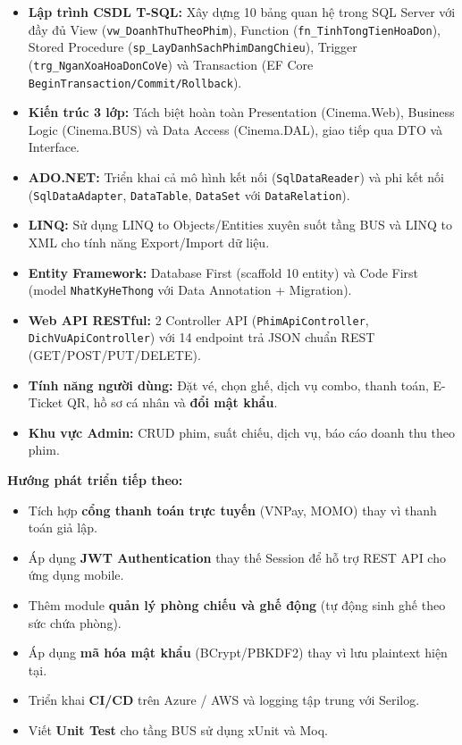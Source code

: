 \documentclass[12pt,a4paper,oneside]{book}
\theoremstyle{plain}
\numberwithin{equation}{chapter}
\begin{document}
\begin{itemize}
    \item \textbf{Lập trình CSDL T-SQL:} Xây dựng 10 bảng quan hệ trong SQL Server với đầy đủ View (\texttt{vw\_DoanhThuTheoPhim}), Function (\texttt{fn\_TinhTongTienHoaDon}), Stored Procedure (\texttt{sp\_LayDanhSachPhimDangChieu}), Trigger (\texttt{trg\_NganXoaHoaDonCoVe}) và Transaction (EF Core \texttt{BeginTransaction/Commit/Rollback}).
    \item \textbf{Kiến trúc 3 lớp:} Tách biệt hoàn toàn Presentation (Cinema.Web), Business Logic (Cinema.BUS) và Data Access (Cinema.DAL), giao tiếp qua DTO và Interface.
    \item \textbf{ADO.NET:} Triển khai cả mô hình kết nối (\texttt{SqlDataReader}) và phi kết nối (\texttt{SqlDataAdapter}, \texttt{DataTable}, \texttt{DataSet} với \texttt{DataRelation}).
    \item \textbf{LINQ:} Sử dụng LINQ to Objects/Entities xuyên suốt tầng BUS và LINQ to XML cho tính năng Export/Import dữ liệu.
    \item \textbf{Entity Framework:} Database First (scaffold 10 entity) và Code First (model \texttt{NhatKyHeThong} với Data Annotation + Migration).
    \item \textbf{Web API RESTful:} 2 Controller API (\texttt{PhimApiController}, \texttt{DichVuApiController}) với 14 endpoint trả JSON chuẩn REST (GET/POST/PUT/DELETE).
    \item \textbf{Tính năng người dùng:} Đặt vé, chọn ghế, dịch vụ combo, thanh toán, E-Ticket QR, hồ sơ cá nhân và \textbf{đổi mật khẩu}.
    \item \textbf{Khu vực Admin:} CRUD phim, suất chiếu, dịch vụ, báo cáo doanh thu theo phim.
\end{itemize}

\noindent\textbf{Hướng phát triển tiếp theo:}

\begin{itemize}
    \item Tích hợp \textbf{cổng thanh toán trực tuyến} (VNPay, MOMO) thay vì thanh toán giả lập.
    \item Áp dụng \textbf{JWT Authentication} thay thế Session để hỗ trợ REST API cho ứng dụng mobile.
    \item Thêm module \textbf{quản lý phòng chiếu và ghế động} (tự động sinh ghế theo sức chứa phòng).
    \item Áp dụng \textbf{mã hóa mật khẩu} (BCrypt/PBKDF2) thay vì lưu plaintext hiện tại.
    \item Triển khai \textbf{CI/CD} trên Azure / AWS và logging tập trung với Serilog.
    \item Viết \textbf{Unit Test} cho tầng BUS sử dụng xUnit và Moq.
\end{itemize}
\end{document}
